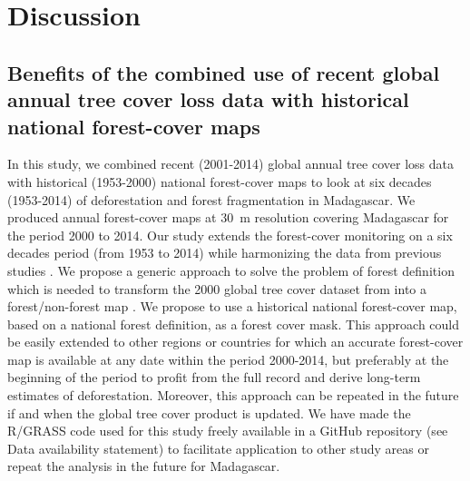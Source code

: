 \documentclass[a4paper, 12pt, leqno]{article} %
\begin{document}
\newpage

\section{Discussion}
\label{discussion}

\subsection{Benefits of the combined use of recent global annual
  tree cover loss data with historical national forest-cover maps}

In this study, we combined recent (2001-2014) global annual tree cover
loss data \citep{Hansen2013} with historical (1953-2000) national
forest-cover maps \citep{Harper2007} to look at six decades
(1953-2014) of deforestation and forest fragmentation in
Madagascar. We produced annual forest-cover maps at 30~m resolution
covering Madagascar for the period 2000 to 2014. Our study extends the
forest-cover monitoring on a six decades period (from 1953 to 2014)
while harmonizing the data from previous studies \citep{Harper2007,
  MEFT2009, ONE2015}. We propose a generic approach to solve the
problem of forest definition which is needed to transform the 2000
global tree cover dataset from \citet{Hansen2013} into a
forest/non-forest map \citep{Tropek2014}. We propose to use a
historical national forest-cover map, based on a national forest
definition, as a forest cover mask. This approach could be easily
extended to other regions or countries for which an accurate
forest-cover map is available at any date within the period 2000-2014,
but preferably at the beginning of the period to profit from the full
record and derive long-term estimates of deforestation. Moreover, this
approach can be repeated in the future if and when the global tree
cover product is updated. We have made the R/GRASS code used for this
study freely available in a GitHub repository (see Data availability
statement) to facilitate application to other study areas or repeat
the analysis in the future for Madagascar.
\end{document}
